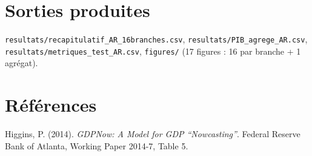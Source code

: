 \documentclass[11pt,a4paper]{article}
\begin{document}
\section{Sorties produites}

\texttt{resultats/recapitulatif\_AR\_16branches.csv}, \texttt{resultats/PIB\_agrege\_AR.csv}, \texttt{resultats/metriques\_test\_AR.csv}, \texttt{figures/} (17 figures : 16 par branche + 1 agrégat).

\section*{Références}
\begin{enumerate}[leftmargin=1.6em, label=\textbf{[\arabic*]}]
\item \hypertarget{ref1}{} Higgins, P. (2014). \textit{GDPNow: A Model for GDP ``Nowcasting''}. Federal Reserve Bank of Atlanta, Working Paper 2014-7, Table 5.
\end{enumerate}
\end{document}
